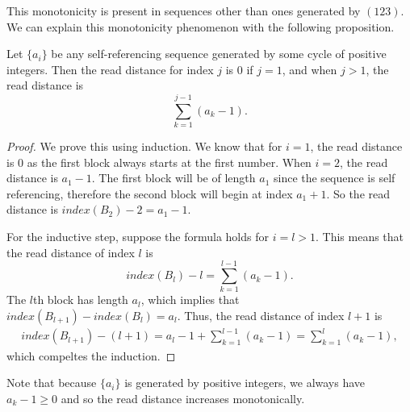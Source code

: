 \documentclass[runningheads,a4paper]{llncs}
\begin{document}
This monotonicity is present in sequences other than ones generated by $(123)$. We can explain this monotonicity phenomenon with the following proposition.
\begin{proposition} 
\label{readdistformula}
Let $\{a_i\}$ be any self-referencing sequence generated by some cycle of positive integers. Then the read distance for index $j$ is 0 if $j =1$, and when $j>1$, the read distance is
\begin{equation*}
\sum_{k=1}^{j-1}( a_k - 1).
\end{equation*} 
\end{proposition}
\begin{proof}
We prove this using induction. We know that for $i=1$, the read distance is $0$ as the first block always starts at the first number. When $i=2$, the read distance is $a_1-1$. The first block will be of length $a_1$ since the sequence is self referencing, therefore the second block will begin at index $a_1+1$. So the read distance is $index(B_2) - 2 = a_1 -1$.

For the inductive step, suppose the formula holds for $i=l > 1$. This means that the read distance of index $l$ is
\begin{equation*}
index(B_l) - l = \sum_{k=1}^{l-1}( a_k - 1).
\end{equation*} 
The $l$th block has length $a_l$, which implies that $index(B_{l+1}) - index(B_l) = a_l$. Thus, the read distance of index $l+1$ is
\begin{align*}
index(B_{l+1}) - (l+1) = a_l - 1 + \sum_{k=1}^{l-1} (a_k-1) = \sum_{k=1}^{l} (a_k-1),
\end{align*}
which compeltes the induction.
\end{proof}
Note that because $\{a_i\}$ is generated by positive integers, we always have $a_k-1\geq 0$ and so the read distance increases monotonically. 

\end{document}
